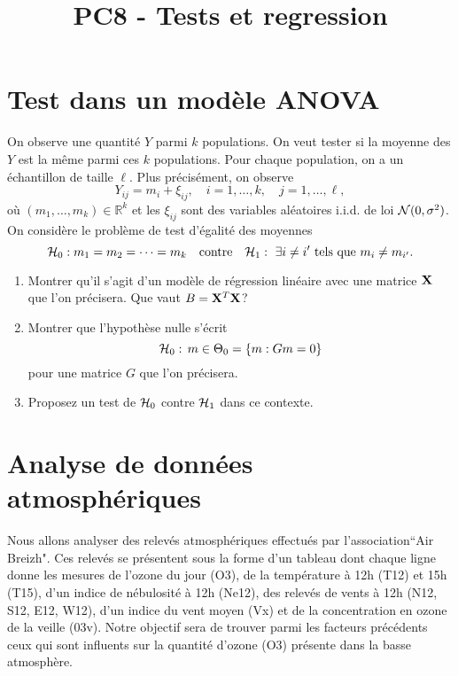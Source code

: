 \documentclass[a4paper,11pt,fleqn]{article}
\title{{\bf PC8 - Tests et regression}}
\author{}
\date{}
\newcommand{\R}{\ensuremath{\mathbb{R}}}
\newcommand{\1}{\ensuremath{\mathbbm{1}}}
\begin{document}
\maketitle

\section{Test dans un mod\`ele ANOVA}

On observe une quantit\'e $Y$ parmi $k$ populations.  On veut tester si la moyenne des $Y$ est la m\^eme parmi ces $k$ populations. Pour chaque population, on a un \'echantillon de taille $\ell$. Plus pr\'ecis\'ement,
on observe
$$
Y_{ij}= m_i + \xi_{ij}, \quad i=1,\dots, k, \quad j=1,\dots, \ell,
$$
o\`u $(m_1,\dots,m_k)\in \R^k$ et les $\xi_{ij}$ sont des variables
al\'eatoires i.i.d. de loi ${\cal N}(0,\sigma^2)$. On consid\`ere le
probl\`eme de test d'\'egalit\'e des moyennes
$$ {\cal H}_0: m_1=m_2=\dots=m_k \quad\text{contre}\quad
{\cal H}_1: \text{ $\exists i\not=i'$ tels que $m_i\not=m_{i'}$}.$$
\begin{enumerate}
\item Montrer qu'il s'agit d'un mod\`ele de r\'egression lin\'eaire
avec une matrice ${\bf X}$ que l'on pr\'ecisera. Que vaut $B={\bf X}^T{\bf X}$?
\item Montrer que l'hypoth\`ese nulle s'\'ecrit
$${\cal H}_0:\, m\in \Theta_0= \{m: Gm =0\}$$ pour une
matrice $G$ que l'on pr\'ecisera.
\item Proposez un test de ${\cal H}_{0}$ contre ${\cal H}_{1}$ dans ce contexte.
\end{enumerate}








\section{Analyse de donn\'ees atmosph\'eriques}
Nous allons analyser des relev\'es atmosph\'eriques effectu\'es par l'association``Air Breizh".
Ces relev\'es se pr\'esentent sous la forme d'un tableau dont chaque ligne donne les mesures de l'ozone du jour (O3), de la temp\'erature \`a 12h (T12) et 15h (T15), d'un indice de n\'ebulosit\'e \`a 12h (Ne12), des relev\'es de vents \`a 12h (N12, S12, E12, W12),
d'un indice du vent moyen (Vx) et de la concentration en ozone de la veille (03v).
Notre objectif sera de trouver parmi  les facteurs pr\'ec\'edents ceux qui sont influents sur la quantit\'e d'ozone (O3) pr\'esente dans la basse atmosph\`ere.  \medskip
\end{document}
